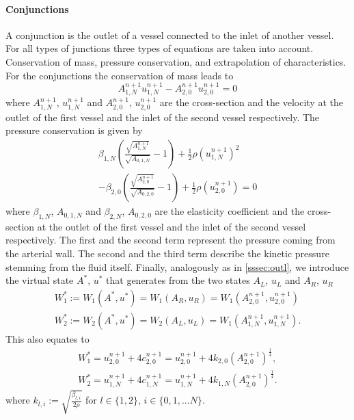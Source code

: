 \documentclass[a4paper, oneside]{discothesis}
\begin{document}
	\paragraph{Conjunctions} \label{par:conjunctions}
	A conjunction is the outlet of a vessel connected to the inlet of another vessel.
	For all types of junctions three types of equations are taken into account. 
	Conservation of mass, pressure conservation, and extrapolation of characteristics.
	For the conjunctions the conservation of mass leads to 
	\begin{equation}
		A_{1,N}^{n+1} u_{1,N}^{n+1} - A_{2,0}^{n+1} u_{2,0}^{n+1}=0
	\end{equation}
	where $A_{1,N}^{n+1}$, $u_{1,N}^{n+1}$ and $A_{2,0}^{n+1}$, $u_{2,0}^{n+1}$ are the cross-section and the velocity at the outlet of the first vessel and the inlet of the second vessel respectively.
	The pressure conservation is given by 
	\begin{multline}
		\beta_{1,N} \left( \frac{\sqrt{A_{1,N}^{n+1}}}{\sqrt{A_{0,1,N}}}-1\right)+\frac{1}{2} \rho \left( u_{1,N}^{n+1} \right) ^2 \\
		-\beta_{2,0} \left( \frac{\sqrt{A_{2,0}^{n+1}}}{\sqrt{A_{0,2,0}}}-1\right)+\frac{1}{2} \rho \left( u_{2,0}^{n+1} \right)=0
	\end{multline}
	where $\beta_{1,N}$, $A_{0,1,N}$ and $\beta_{2,N}$, $A_{0,2,0}$ are the elasticity coefficient and the cross-section at the outlet of the first vessel and the inlet of the second vessel respectively.
	The first and the second term represent the pressure coming from the arterial wall.
	The second and the third term describe the kinetic pressure stemming from the fluid itself.
	Finally, analogously as in \autoref{sssec:outl}, we introduce the virtual state $A^*$, $u^*$ that generates from the two states $A_L$, $u_L$ and $A_R$, $u_R$
	\begin{align}
		W_1^* := W_1(A^*,u^*) = W_1(A_R,u_R) = W_1(A_{2,0}^{n+1}, u_{2,0}^{n+1}) \\
		W_2^* := W_2(A^*,u^*) = W_2(A_L,u_L) = W_1(A_{1,N}^{n+1}, u_{1,N}^{n+1}).
	\end{align}
	This also equates to 
	\begin{align}
		W_1^* = u_{2,0}^{n+1} + 4c_{2,0}^{n+1} = u_{2,0}^{n+1} + 4k_{2,0} \left( A_{2,0}^{n+1} \right)^{\frac{1}{4}}, \\
		W_2^* = u_{1,N}^{n+1} + 4c_{1,N}^{n+1} = u_{1,N}^{n+1} + 4k_{1,N} \left( A_{2,0}^{n+1} \right)^{\frac{1}{4}}.
	\end{align}
	where $k_{l,i} := \sqrt{\frac{\beta_{l,i}}{2\rho}}$ for $l \in \{1,2\}$, $i \in \{0,1,...N\}$.
\end{document}
